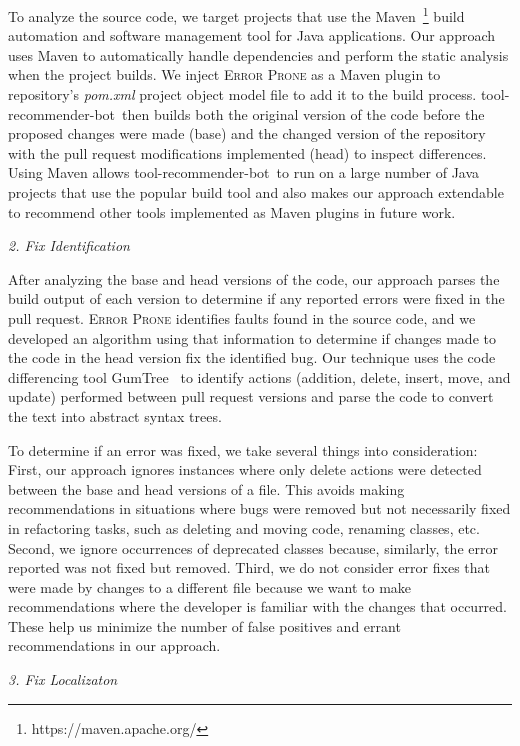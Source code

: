 \documentclass[conference]{IEEEtran}
\newcommand{\tool}{tool-recommender-bot}
\newcommand{\pseudosubsection}[1]{\vspace{2mm} {\it #1}}
\begin{document}
To analyze the source code, we target projects that use the Maven~\footnote{https://maven.apache.org/} build automation and software management tool for Java applications. Our approach uses Maven to automatically handle dependencies and perform the static analysis when the project builds. We inject \textsc{Error Prone} as a Maven plugin to repository's \textit{pom.xml} project object model file to add it to the build process. \tool~then builds both the original version of the code before the proposed changes were made (base) and the changed version of the repository with the pull request modifications implemented (head) to inspect differences. Using Maven allows \tool~to run on a large number of Java projects that use the popular build tool and also makes our approach extendable to recommend other tools implemented as Maven plugins in future work. 

\pseudosubsection{2. Fix Identification}

After analyzing the base and head versions of the code, our approach parses the build output of each version to determine if any reported errors were fixed in the pull request. \textsc{Error Prone} identifies faults found in the source code, and we developed an algorithm using that information to determine if changes made to the code in the head version fix the identified bug. Our technique uses the code differencing tool GumTree~\cite{GumTree} to identify actions (addition, delete, insert, move, and update) performed between pull request versions and parse the code to convert the text into abstract syntax trees. 

To determine if an error was fixed, we take several things into consideration: First, our approach ignores instances where only delete actions were detected between the base and head versions of a file. This avoids making recommendations in situations where bugs were removed but not necessarily fixed in refactoring tasks, such as deleting and moving code, renaming classes, etc. Second, we ignore occurrences of deprecated classes because, similarly, the error reported was not fixed but removed. Third, we do not consider error fixes that were made by changes to a different file because we want to make recommendations where the developer is familiar with the changes that occurred. These help us minimize the number of false positives and errant recommendations in our approach.

\pseudosubsection{3. Fix Localizaton}
\end{document}
